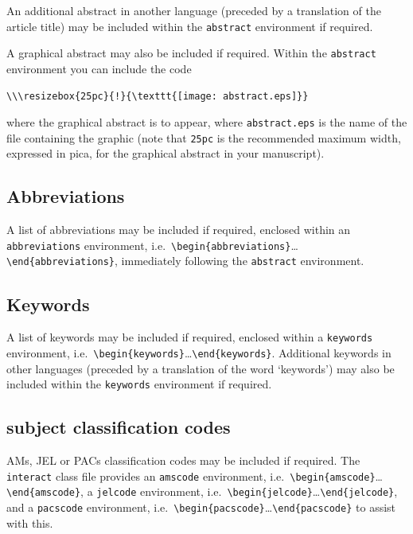 \documentclass[]{interact}
\theoremstyle{plain}%
\theoremstyle{definition}
\theoremstyle{remark}
\begin{document}
An additional abstract in another language (preceded by a translation of the article title) may be included within the \verb"abstract" environment if required.

A graphical abstract may also be included if required. Within the \verb"abstract" environment you can include the code
\begin{verbatim}
\\\resizebox{25pc}{!}{\texttt{[image: abstract.eps]}}
\end{verbatim}
where the graphical abstract is to appear, where \verb"abstract.eps" is the name of the file containing the graphic (note that \verb"25pc" is the recommended maximum width, expressed in pica, for the graphical abstract in your manuscript).


\subsection{Abbreviations}

A list of abbreviations may be included if required, enclosed within an \texttt{abbreviations} environment, i.e.\ \verb"\begin{abbreviations}"\ldots\verb"\end{abbreviations}", immediately following the \verb"abstract" environment.


\subsection{Keywords}

A list of keywords may be included if required, enclosed within a \texttt{keywords} environment, i.e.\ \verb"\begin{keywords}"\ldots\verb"\end{keywords}". Additional keywords in other languages (preceded by a translation of the word `keywords') may also be included within the \verb"keywords" environment if required.


\subsection{subject classification codes}

AMs, JEL or PACs classification codes may be included if required. The \texttt{interact} class file provides an \texttt{amscode} environment, i.e.\ \verb"\begin{amscode}"\ldots\verb"\end{amscode}", a \texttt{jelcode} environment, i.e.\ \verb"\begin{jelcode}"\ldots\verb"\end{jelcode}", and a \texttt{pacscode} environment, i.e.\ \verb"\begin{pacscode}"\ldots\verb"\end{pacscode}" to assist with this.
\end{document}
